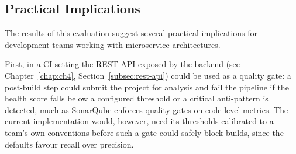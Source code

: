 
\subsection{Practical Implications}
\label{subsec:practical-implications}

\par The results of this evaluation suggest several practical implications for development teams working with microservice architectures.

\par First, in a CI setting the REST API exposed by the backend (see Chapter~\ref{chap:ch4}, Section~\ref{subsec:rest-api}) could be used as a quality gate: a post-build step could submit the project for analysis and fail the pipeline if the health score falls below a configured threshold or a critical anti-pattern is detected, much as SonarQube enforces quality gates on code-level metrics. The current implementation would, however, need its thresholds calibrated to a team's own conventions before such a gate could safely block builds, since the defaults favour recall over precision.

